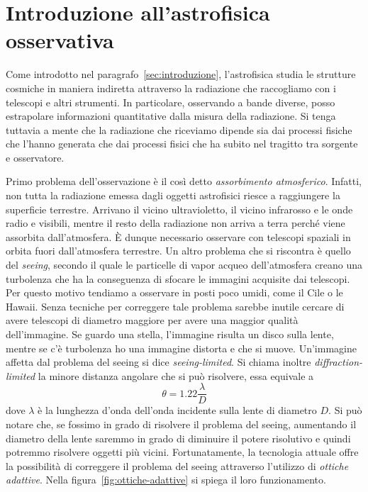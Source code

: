 \section{Introduzione all'astrofisica osservativa}\label{sec:astrofisica-osservativa}
Come introdotto nel paragrafo~\ref{sec:introduzione}, l'astrofisica studia le strutture cosmiche in maniera indiretta attraverso la radiazione che raccogliamo con i telescopi e altri strumenti. In particolare, osservando a bande diverse, posso estrapolare informazioni quantitative dalla misura della radiazione. Si tenga tuttavia a mente che la radiazione che riceviamo dipende sia dai processi fisiche che l'hanno generata che dai processi fisici che ha subito nel tragitto tra sorgente e osservatore.

Primo problema dell'osservazione è il così detto \emph{assorbimento atmosferico}. Infatti, non tutta la radiazione emessa dagli oggetti astrofisici riesce a raggiungere la superficie terrestre. Arrivano il vicino ultravioletto, il vicino infrarosso e le onde radio e visibili, mentre il resto della radiazione non arriva a terra perché viene assorbita dall'atmosfera. È dunque necessario osservare con telescopi spaziali in orbita fuori dall'atmosfera terrestre. Un altro problema che si riscontra è quello del \emph{seeing}, secondo il quale le particelle di vapor acqueo dell'atmosfera creano una turbolenza che ha la conseguenza di sfocare le immagini acquisite dai telescopi. Per questo motivo tendiamo a osservare in posti poco umidi, come il Cile o le Hawaii. Senza tecniche per correggere tale problema sarebbe inutile cercare di avere telescopi di diametro maggiore per avere una maggior qualità dell'immagine. Se guardo una stella, l'immagine risulta un disco sulla lente, mentre se c'è turbolenza ho una immagine distorta e che si muove. Un'immagine affetta dal problema del seeing si dice \emph{seeing-limited}. Si chiama inoltre \emph{diffraction-limited} la minore distanza angolare che si può risolvere, essa equivale a
\[
    \theta = 1.22 \frac{\lambda}{D}
\]
dove $\lambda$ è la lunghezza d'onda dell'onda incidente sulla lente di diametro $D$. Si può notare che, se fossimo in grado di risolvere il problema del seeing, aumentando il diametro della lente saremmo in grado di diminuire il potere risolutivo e quindi potremmo risolvere oggetti più vicini. Fortunatamente, la tecnologia attuale offre la possibilità di correggere il problema del seeing attraverso l'utilizzo di \emph{ottiche adattive}. Nella figura~\ref{fig:ottiche-adattive} si spiega il loro funzionamento. 

